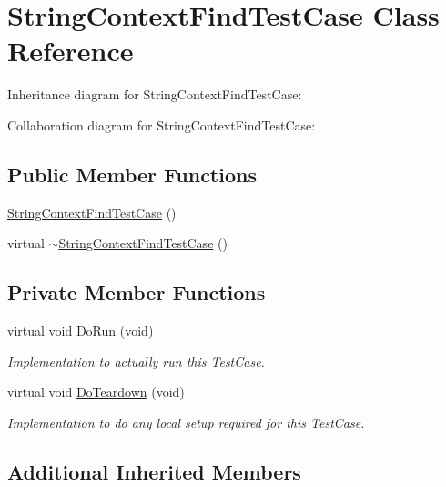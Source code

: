 \hypertarget{classStringContextFindTestCase}{}\section{String\+Context\+Find\+Test\+Case Class Reference}
\label{classStringContextFindTestCase}


Inheritance diagram for String\+Context\+Find\+Test\+Case\+:


Collaboration diagram for String\+Context\+Find\+Test\+Case\+:
\subsection*{Public Member Functions}
\begin{DoxyCompactItemize}
\item 
\hyperlink{classStringContextFindTestCase_abc40fed293ec59ff0c5cebfb91f3a1ff}{String\+Context\+Find\+Test\+Case} ()
\item 
virtual \hyperlink{classStringContextFindTestCase_a84b2f36575fc8564eae850785d3dd44b}{$\sim$\+String\+Context\+Find\+Test\+Case} ()
\end{DoxyCompactItemize}
\subsection*{Private Member Functions}
\begin{DoxyCompactItemize}
\item 
virtual void \hyperlink{classStringContextFindTestCase_a28c3c1d2064ba6087b34cf0d241cf03f}{Do\+Run} (void)
\begin{DoxyCompactList}\small\item\em Implementation to actually run this Test\+Case. \end{DoxyCompactList}\item 
virtual void \hyperlink{classStringContextFindTestCase_a761ca987fc36aa53f815560f3f5415ee}{Do\+Teardown} (void)
\begin{DoxyCompactList}\small\item\em Implementation to do any local setup required for this Test\+Case. \end{DoxyCompactList}\end{DoxyCompactItemize}
\subsection*{Additional Inherited Members}


